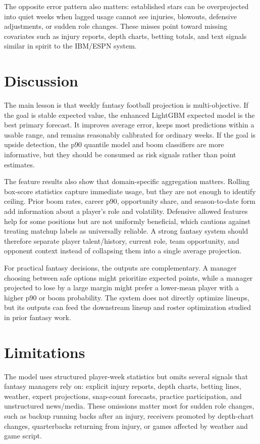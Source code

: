 \documentclass{article}
\begin{document}
The opposite error pattern also matters: established stars can be overprojected into quiet weeks when lagged usage cannot see injuries, blowouts, defensive adjustments, or sudden role changes. These misses point toward missing covariates such as injury reports, depth charts, betting totals, and text signals similar in spirit to the IBM/ESPN system.

\FloatBarrier
\section{Discussion}
The main lesson is that weekly fantasy football projection is multi-objective. If the goal is stable expected value, the enhanced LightGBM expected model is the best primary forecast. It improves average error, keeps most predictions within a usable range, and remains reasonably calibrated for ordinary weeks. If the goal is upside detection, the p90 quantile model and boom classifiers are more informative, but they should be consumed as risk signals rather than point estimates.

The feature results also show that domain-specific aggregation matters. Rolling box-score statistics capture immediate usage, but they are not enough to identify ceiling. Prior boom rates, career p90, opportunity share, and season-to-date form add information about a player's role and volatility. Defensive allowed features help for some positions but are not uniformly beneficial, which cautions against treating matchup labels as universally reliable. A strong fantasy system should therefore separate player talent/history, current role, team opportunity, and opponent context instead of collapsing them into a single average projection.

For practical fantasy decisions, the outputs are complementary. A manager choosing between safe options might prioritize expected points, while a manager projected to lose by a large margin might prefer a lower-mean player with a higher p90 or boom probability. The system does not directly optimize lineups, but its outputs can feed the downstream lineup and roster optimization studied in prior fantasy work.

\section{Limitations}
The model uses structured player-week statistics but omits several signals that fantasy managers rely on: explicit injury reports, depth charts, betting lines, weather, expert projections, snap-count forecasts, practice participation, and unstructured news/media. These omissions matter most for sudden role changes, such as backup running backs after an injury, receivers promoted by depth-chart changes, quarterbacks returning from injury, or games affected by weather and game script.
\end{document}
